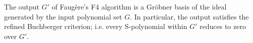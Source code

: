 \begin{theorem}[Result of F4]
    \label{def:FaugereF4Result}
    \leanok
    The output \(G'\) of Faug\`ere's F4 algorithm is a Gr\"obner basis of the ideal
    generated by the input polynomial set \(G\). In particular, the output
    satisfies the refined Buchberger criterion; i.e. every S-polynomial within
    \(G'\) reduces to zero over \(G'\).
\end{theorem}